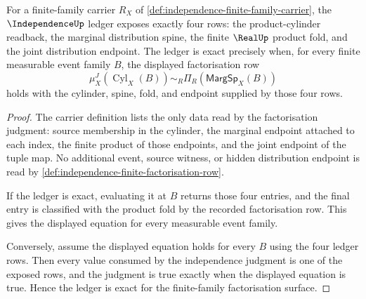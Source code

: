\begin{theorem}
\label{thm:independence-obligation-ledger-exactness}
For a finite-family carrier $R_X$ of \autoref{def:independence-finite-family-carrier}, the $\IndependenceUp$ ledger exposes exactly four rows: the product-cylinder readback, the marginal distribution spine, the finite $\RealUp$ product fold, and the joint distribution endpoint. The ledger is exact precisely when, for every finite measurable event family $B$, the displayed factorisation row
$$
\mu_X^J(\operatorname{Cyl}_X(B))\sim_R\Pi_R(\mathsf{MargSp}_X(B))
$$
holds with the cylinder, spine, fold, and endpoint supplied by those four rows.
\end{theorem}
\begin{proof}
The carrier definition lists the only data read by the factorisation judgment: source membership in the cylinder, the marginal endpoint attached to each index, the finite product of those endpoints, and the joint endpoint of the tuple map. No additional event, source witness, or hidden distribution endpoint is read by \autoref{def:independence-finite-factorisation-row}.

If the ledger is exact, evaluating it at $B$ returns those four entries, and the final entry is classified with the product fold by the recorded factorisation row. This gives the displayed equation for every measurable event family.

Conversely, assume the displayed equation holds for every $B$ using the four ledger rows. Then every value consumed by the independence judgment is one of the exposed rows, and the judgment is true exactly when the displayed equation is true. Hence the ledger is exact for the finite-family factorisation surface.
\end{proof}

